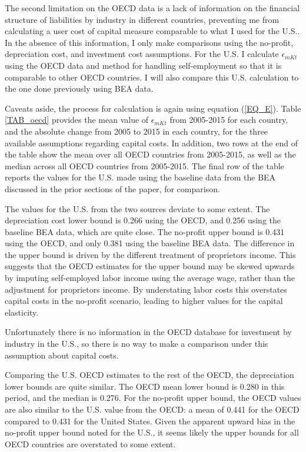 \documentclass[11pt]{article}
\begin{document}
The second limitation on the OECD data is a lack of information on the financial structure of liabilities by industry in different countries, preventing me from calculating a user cost of capital measure comparable to what I used for the U.S.. In the absence of this information, I only make comparisons using the no-profit, depreciation cost, and investment cost assumptions. For the U.S. I calculate $\epsilon_{mKt}$ using the OECD data and method for handling self-employment so that it is comparable to other OECD countries. I will also compare this U.S. calculation to the one done previously using BEA data.

Caveats aside, the process for calculation is again using equation (\ref{EQ_E}). Table \ref{TAB_oecd} provides the mean value of $\epsilon_{mKt}$ from 2005-2015 for each country, and the absolute change from 2005 to 2015 in each country, for the three available assumptions regarding capital costs. In addition, two rows at the end of the table show the mean over all OECD countries from 2005-2015, as well as the median across all OECD countries from 2005-2015. The final row of the table reports the values for the U.S. made using the baseline data from the BEA discussed in the prior sections of the paper, for comparison.

The values for the U.S. from the two sources deviate to some extent. The depreciation cost lower bound is 0.266 using the OECD, and 0.256 using the baseline BEA data, which are quite close. The no-profit upper bound is 0.431 using the OECD, and only 0.381 using the baseline BEA data. The difference in the upper bound is driven by the different treatment of proprietors income. This suggests that the OECD estimates for the upper bound may be skewed upwards by imputing self-employed labor income using the average wage, rather than the \cite{gommerupert2004} adjustment for proprietors income. By understating labor costs this overstates capital costs in the no-profit scenario, leading to higher values for the capital elasticity.

Unfortunately there is no information in the OECD database for investment by industry in the U.S., so there is no way to make a comparison under this assumption about capital costs.

Comparing the U.S. OECD estimates to the rest of the OECD, the depreciation lower bounds are quite similar. The OECD mean lower bound is 0.280 in this period, and the median is 0.276. For the no-profit upper bound, the OECD values are also similar to the U.S. value from the OECD: a mean of 0.441 for the OECD compared to 0.431 for the United States. Given the apparent upward bias in the no-profit upper bound noted for the U.S., it seems likely the upper bounds for all OECD countries are overstated to some extent.  
\end{document}
